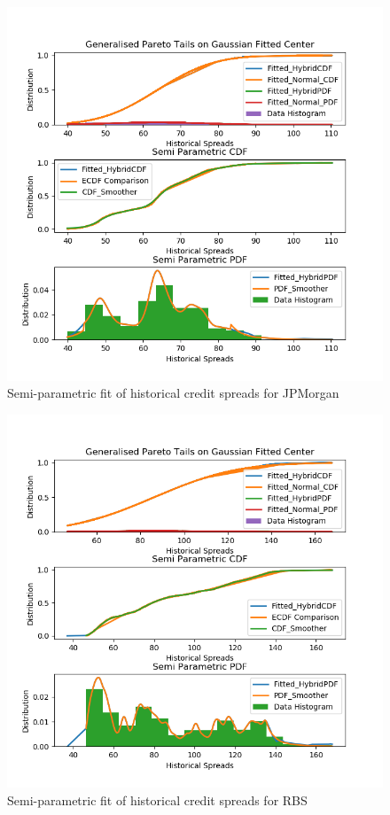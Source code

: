 \documentclass{report}
\theoremstyle{plain}
\theoremstyle{definition}
\begin{document}
\begin{figure}[H]
	\begin{center}
		\includegraphics[width=15cm]{SemiParametricFit_JPMCC_CDS_USD_SR_5Y_D14.png}
		\caption{Semi-parametric fit of historical credit spreads for JPMorgan} 
		\label{SemiParametricFit_JPMCC_CDS_USD_SR_5Y_D14}
	\end{center}
\end{figure}

\begin{figure}[H]
	\begin{center}
		\includegraphics[width=15cm]{SemiParametricFit_RBSPLC_CDS_EUR_SR_5Y_D14.png}
		\caption{Semi-parametric fit of historical credit spreads for RBS} 
		\label{SemiParametricFit_RBSPLC_CDS_EUR_SR_5Y_D14}
	\end{center}
\end{figure}
\end{document}
